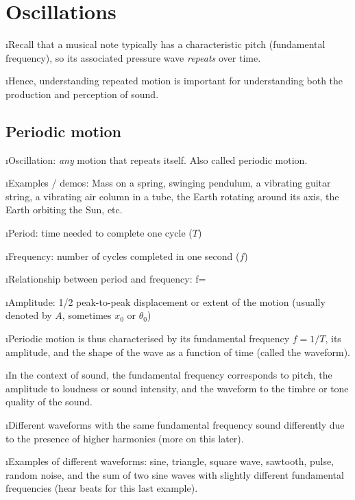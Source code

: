 \section{Oscillations}

\bi

\i Recall that a musical note typically has a characteristic 
pitch (fundamental frequency), so its associated pressure wave 
{\em repeats} over time.

\i Hence, understanding repeated motion 
is important for understanding both the production and 
perception of sound.

\ei

\subsection{Periodic motion}

\bi

\i Oscillation: {\em any} motion that repeats itself.
Also called periodic motion.

\i Examples / demos: Mass on a spring, swinging pendulum,
a vibrating guitar string, a vibrating air column in a tube,
the Earth rotating around its axis, the Earth orbiting the Sun,
etc.

\i Period: time needed to complete one cycle ($T$)

\i Frequency: number of cycles completed in one second ($f$)

\i Relationship between period and frequency:
%
\be
f=
\ee
%

\i Amplitude: 1/2 peak-to-peak displacement or extent of the motion
(usually denoted by $A$, sometimes $x_0$ or $\theta_0$)

\i Periodic motion is thus characterised by its fundamental frequency
$f=1/T$, its amplitude, and the shape of the wave as a function of
time (called the waveform).

\i In the context of sound, the fundamental frequency corresponds to
pitch, the amplitude to loudness or sound intensity, and the waveform 
to the timbre or tone quality of the sound.

\i Different waveforms with the same fundamental frequency sound 
differently due to the presence of higher harmonics (more on this
later).

\i Examples of different waveforms:
sine, triangle, square wave, sawtooth, pulse, random noise, and
the sum of two sine waves with slightly different fundamental 
frequencies (hear beats for this last example).

